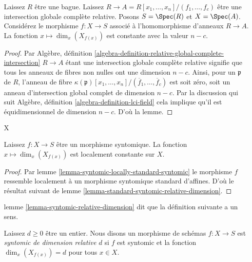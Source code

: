\begin{lemma}

\label{lemma-standard-syntomic-relative-dimension}
Laissez $R$ être une bague. Laissez $R \to A = R[x_1, \ldots, x_n]/(f_1, \ldots, f_c)$ être une intersection globale complète relative. Posons $S = \Spec(R)$ et $X = \Spec(A)$. Considérez le morphisme $f : X \to S$ associé à l'homomorphisme d'anneaux $R \to A$. La fonction $x \mapsto \dim_x(X_{f(x)})$ est constante avec la valeur $n - c$.
\end{lemma}

\begin{proof}
Par Algèbre, définition \ref{algebra-definition-relative-global-complete-intersection} $R \to A$ étant une intersection globale complète relative signifie que tous les anneaux de fibres non nulles ont une dimension $n - c$. Ainsi, pour un $\mathfrak p$ de $R$, l'anneau de fibre $\kappa(\mathfrak p)[x_1, \ldots, x_n]/(\overline{f}_1, \ldots, \overline{f}_c)$ est soit zéro, soit un anneau d'intersection global complet de dimension $n - c$. Par la discussion qui suit Algèbre, définition \ref{algebra-definition-lci-field} cela implique qu'il est équidimensionnel de dimension $n - c$. D'où la lemme.
\end{proof}
X

\begin{lemma}

\label{lemma-syntomic-relative-dimension}
Laissez $f : X \to S$ être un morphisme syntomique. La fonction $x \mapsto \dim_x(X_{f(x)})$ est localement constante sur $X$.
\end{lemma}

\begin{proof}
Par lemme \ref{lemma-syntomic-locally-standard-syntomic} le morphisme $f$ ressemble localement à un morphisme syntomique standard d'affines. D'où le résultat suivant de lemme \ref{lemma-standard-syntomic-relative-dimension}.
\end{proof}

\noindent
lemme \ref{lemma-syntomic-relative-dimension} dit que la définition suivante a un sens.

\begin{definition}

\label{definition-syntomic-relative-dimension}
Laissez $d \geq 0$ être un entier. Nous disons un morphisme de schémas $f : X \to S$ est {\it syntomic de dimension relative $d$} si $f$ est syntomic et la fonction $\dim_x(X_{f(x)}) = d$ pour tous $x \in X$.
\end{definition}

